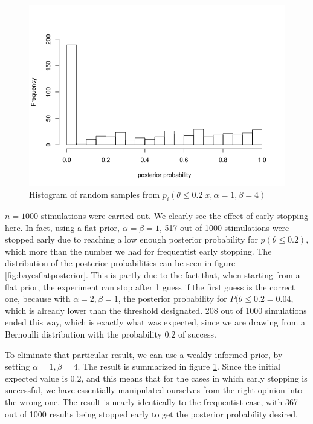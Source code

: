 \begin{figure}[h] 
\begin{center}
\includegraphics[scale=0.5]{bayesstop14allpost.png}
	\caption{Histogram of random samples from $p_i(\theta\leq 0.2|x,\alpha=1, \beta=4)$}
	\label{fig:bayes14posterior}
\end{center}	
\end{figure}

$n=1000$ stimulations were carried out. We clearly see the effect of early stopping here. In fact, using a flat prior, $\alpha=\beta=1$, 517 out of 1000 stimulations were stopped early due to reaching a low enough posterior probability for $p(\theta \leq 0.2)$, which more than the number we had for frequentist early stopping. The distribution of the posterior probabilities can be seen in figure \ref{fig:bayesflatposterior}. This is partly due to the fact that, when starting from a flat prior, the  experiment can stop after 1 guess if the first guess is the correct one, because with $\alpha = 2, \beta=1$, the posterior probability for $P(\theta\leq 0.2 = 0.04$, which is already lower than the threshold designated. 208 out of 1000 simulations ended this way, which is exactly what was expected, since we are drawing from a Bernoulli distribution with the probability $0.2$ of success. 

To eliminate that particular result, we can use a weakly informed prior, by setting $\alpha = 1, \beta=4$. The result is summarized in figure \ref{fig:bayes14posterior}. Since the initial expected value is $0.2$, and this means that for the cases in which early stopping is successful, we have essentially manipulated ourselves from the right opinion into the wrong one. The result is nearly identically to the frequentist case, with 367 out of 1000 results being stopped early to get the posterior probability desired.


